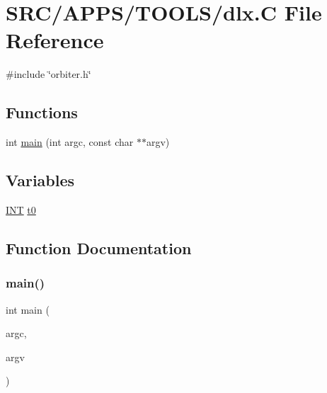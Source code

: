 \hypertarget{_a_p_p_s_2_t_o_o_l_s_2dlx_8_c}{}\section{S\+R\+C/\+A\+P\+P\+S/\+T\+O\+O\+L\+S/dlx.C File Reference}
\label{_a_p_p_s_2_t_o_o_l_s_2dlx_8_c}
{\ttfamily \#include \char`\"{}orbiter.\+h\char`\"{}}\newline
\subsection*{Functions}
\begin{DoxyCompactItemize}
\item 
int \mbox{\hyperlink{_a_p_p_s_2_t_o_o_l_s_2dlx_8_c_a217dbf8b442f20279ea00b898af96f52}{main}} (int argc, const char $\ast$$\ast$argv)
\end{DoxyCompactItemize}
\subsection*{Variables}
\begin{DoxyCompactItemize}
\item 
\mbox{\hyperlink{galois_8h_a09fddde158a3a20bd2dcadb609de11dc}{I\+NT}} \mbox{\hyperlink{_a_p_p_s_2_t_o_o_l_s_2dlx_8_c_a4268f4fe222ffb119218a0199f5e1904}{t0}}
\end{DoxyCompactItemize}


\subsection{Function Documentation}
\mbox{\label{_a_p_p_s_2_t_o_o_l_s_2dlx_8_c_a217dbf8b442f20279ea00b898af96f52}} 
\subsubsection{\texorpdfstring{main()}{main()}}
{\footnotesize\ttfamily int main (\begin{DoxyParamCaption}\item[{int}]{argc,  }\item[{const char $\ast$$\ast$}]{argv }\end{DoxyParamCaption})}




